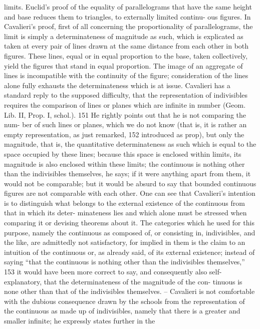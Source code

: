 limits. Euclid’s proof of the equality of parallelograms that have the same
height and base reduces them to triangles, to externally limited continu-
ous figures. In Cavalieri’s proof, first of all concerning the proportionality
of parallelograms, the limit is simply a determinateness of magnitude as
such, which is explicated as taken at every pair of lines drawn at the same
distance from each other in both figures. These lines, equal or in equal
proportion to the base, taken collectively, yield the figures that stand in
equal proportion. The image of an aggregate of lines is incompatible with
the continuity of the figure; consideration of the lines alone fully exhausts
the determinateness which is at issue. Cavalieri has a standard reply to the
supposed difficulty, that the representation of indivisibles requires the
comparison of lines or planes which are infinite in number (Geom. Lib. II,
Prop. I, schol.). 151 He rightly points out that he is not comparing the num-
ber of such lines or planes, which we do not know (that is, it is rather an
empty representation, as just remarked, 152 introduced as prop), but only the
magnitude, that is, the quantitative determinateness as such which is equal
to the space occupied by these lines; because this space is enclosed within
limits, its magnitude is also enclosed within these limits; the continuous is
nothing other than the indivisibles themselves, he says; if it were anything
apart from them, it would not be comparable; but it would be absurd to
say that bounded continuous figures are not comparable with each other.
One can see that Cavalieri’s intention is to distinguish what belongs
to the external existence of the continuous from that in which its deter-
minateness lies and which alone must be stressed when comparing it or
devising theorems about it. The categories which he used for this purpose,
namely the continuous as composed of, or consisting in, indivisibles, and the
like, are admittedly not satisfactory, for implied in them is the claim to
an intuition of the continuous or, as already said, of its external existence;
instead of saying “that the continuous is nothing other than the indivisibles
themselves,” 153 it would have been more correct to say, and consequently
also self-explanatory, that the determinateness of the magnitude of the con-
tinuous is none other than that of the indivisibles themselves. – Cavalieri is
not comfortable with the dubious consequence drawn by the schools from
the representation of the continuous as made up of indivisibles, namely
that there is a greater and smaller infinite; he expressly states further in the
